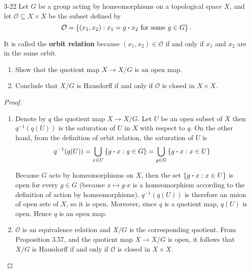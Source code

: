 \begin{problem}{3-22}\label{problem:3-22}
Let $G$ be a group acting by homeomorphisms on a topological space $X$, and let $\mathcal{O} \subseteq X\times X$ be the subset defined by
\begin{equation*}
	\mathcal{O} = \left\{{ (x_{1}, x_{2}) : x_{1} = g\boldsymbol{\cdot} x_{2} \text{ for some $g\in G$} }\right\}.
\end{equation*}

It is called the \textbf{orbit relation} because $(x_{1}, x_{2}) \in \mathcal{O}$ if and only if $x_{1}$ and $x_{2}$ are in the same orbit.
\begin{enumerate}[label={(\alph*)}]
	\item Show that the quotient map $X \to X/G$ is an open map.
	\item Conclude that $X/G$ is Hausdorff if and only if $\mathcal{O}$ is closed in $X\times X$.
\end{enumerate}
\end{problem}

\begin{proof}
	\begin{enumerate}[label={(\alph*)}]
		\item Denote by $q$ the quotient map $X \to X/G$. Let $U$ be an open subset of $X$ then $q^{-1}(q(U))$ is the saturation of $U$ in $X$ with respect to $q$. On the other hand, from the definition of orbit relation, the saturation of $U$ is
		      \begin{align*}
			      q^{-1}(q(U)) = \bigcup_{x\in U} \left\{{ g\boldsymbol{\cdot}x : g \in G }\right\} = \bigcup_{g\in G} \left\{{ g\boldsymbol{\cdot} x : x\in U }\right\}
		      \end{align*}

		      Because $G$ acts by homeomorphisms on $X$, then the set $\left\{{ g\boldsymbol{\cdot} x : x\in U }\right\}$ is open for every $g\in G$ (because $x\mapsto g\boldsymbol{\cdot} x$ is a homeomorphism according to the definition of action by homeomorphisms). $q^{-1}(q(U))$ is therefore an union of open sets of $X$, so it is open. Moreover, since $q$ is a quotient map, $q(U)$ is open. Hence $q$ is an open map.
		\item $\mathcal{O}$ is an equivalence relation and $X/G$ is the corresponding quotient. From Proposition 3.57, and the quotient map $X\to X/G$ is open, it follows that $X/G$ is Hausdorff if and only if $\mathcal{O}$ is closed in $X\times X$.
	\end{enumerate}
\end{proof}

